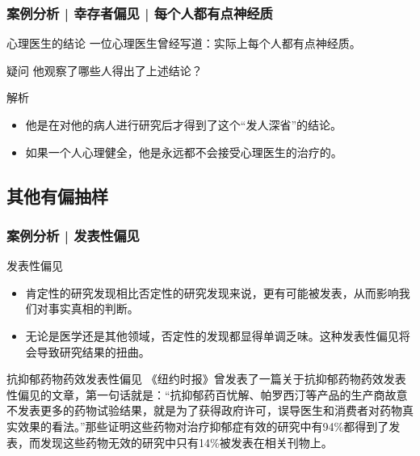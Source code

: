 \begin{frame}
  \frametitle{案例分析 | 幸存者偏见 | 每个人都有点神经质}
  \begin{block}{心理医生的结论}
    一位心理医生曾经写道：实际上每个人都有点神经质。
  \end{block}
  \pause \pause \pause \pause
  \begin{block}{疑问}
    他观察了哪些人得出了上述结论？
  \end{block}
  \pause
  \begin{block}{解析}
    \begin{itemize}
      \item 他是在对他的病人进行研究后才得到了这个“发人深省”的结论。
      \item 如果一个人心理健全，他是永远都不会接受心理医生的治疗的。
    \end{itemize}
  \end{block}
\end{frame}

\subsection{其他有偏抽样}
\begin{frame}
  \frametitle{案例分析 | 发表性偏见}
  \begin{block}{发表性偏见}
    \begin{itemize}
      \item 肯定性的研究发现相比否定性的研究发现来说，更有可能被发表，从而影响我们对事实真相的判断。
      \item 无论是医学还是其他领域，否定性的发现都显得单调乏味。这种发表性偏见将会导致研究结果的扭曲。
    \end{itemize}
  \end{block}
  \pause
  \begin{block}{抗抑郁药物药效发表性偏见}
    《纽约时报》曾发表了一篇关于抗抑郁药物药效发表性偏见的文章，第一句话就是：“抗抑郁药百忧解、帕罗西汀等产品的生产商故意不发表更多的药物试验结果，就是为了获得政府许可，误导医生和消费者对药物真实效果的看法。”那些证明这些药物对治疗抑郁症有效的研究中有94\%都得到了发表，而发现这些药物无效的研究中只有14\%被发表在相关刊物上。
  \end{block}
\end{frame}

